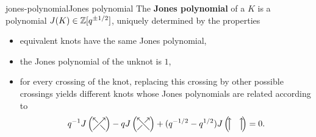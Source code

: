 \begin{topic}{jones-polynomial}{Jones polynomial}
    The \textbf{Jones polynomial} of a  $K$ is a polynomial $J(K) \in \mathbb{Z}[q^{\pm 1/2}]$, uniquely determined by the properties
    \begin{itemize}
        \item equivalent knots have the same Jones polynomial,
        \item the Jones polynomial of the unknot is $1$,
        \item for every crossing of the knot, replacing this crossing by other possible crossings yields different knots whose Jones polynomials are related according to
        \[ \svg q^{-1} J \left( \begin{tikzpicture}[semithick, scale=0.5, baseline=1ex] 
            \draw [-to] (0, 0) -- (1, 1);
            \draw (1, 0) -- (0.6, 0.4);
            \draw [-to] (0.4, 0.6) -- (0, 1);
        \end{tikzpicture} \right) - q J \left( \begin{tikzpicture}[semithick, scale=0.5, baseline=1ex]
            \draw (0, 0) -- (0.4, 0.4);
            \draw [-to] (0.6, 0.6) -- (1, 1);
            \draw [-to] (1, 0) -- (0, 1);
        \end{tikzpicture} \right) + (q^{-1/2} - q^{1/2}) J \left( \begin{tikzpicture}[semithick, scale=0.5, baseline=1ex]
            \draw [-to] (0, 0) -- (0, 1);
            \draw [-to] (1, 0) -- (1, 1);
        \end{tikzpicture} \right) = 0 . \]
    \end{itemize}
\end{topic}

